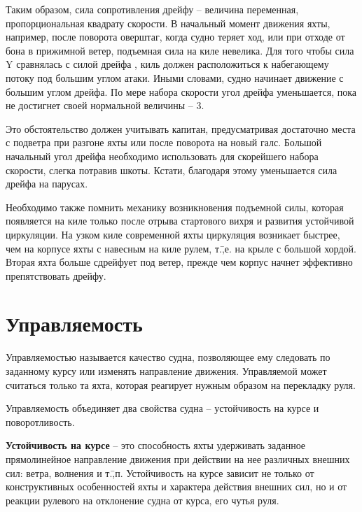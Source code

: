 Таким образом, сила сопротивления дрейфу \--- величина переменная, пропорциональная квадрату скорости. В начальный момент движения яхты, например, после поворота оверштаг, когда судно теряет ход, или при отходе от бона в прижимной ветер, подъемная сила на киле невелика. Для того чтобы сила \ve Y сравнялась с силой дрейфа , киль должен расположиться к набегающему потоку под большим углом атаки. Иными словами, судно начинает движение с большим углом дрейфа. По мере набора скорости угол дрейфа уменьшается, пока не достигнет своей нормальной величины \--- 3\gr.

Это обстоятельство должен учитывать капитан, предусматривая достаточно места с подветра при разгоне яхты или после поворота на новый галс. Большой начальный угол дрейфа необходимо использовать для скорейшего набора скорости, слегка потравив шкоты. Кстати, благодаря этому уменьшается сила дрейфа на парусах. 

Необходимо также помнить механику возникновения подъемной силы, которая появляется на киле только после отрыва стартового вихря и развития устойчивой циркуляции. На узком киле современной яхты циркуляция возникает быстрее, чем на корпусе яхты с навесным на киле рулем, т.\=,е. на крыле с большой хордой. Вторая яхта больше сдрейфует под ветер, прежде чем корпус начнет эффективно препятствовать дрейфу.

\section{Управляемость}

Управляемостью называется качество судна, позволяющее ему следовать по заданному курсу или изменять направление движения. Управляемой может считаться только та яхта, которая реагирует нужным образом на перекладку руля.

Управляемость объединяет два свойства судна \--- устойчивость на курсе и поворотливость.

\textbf{Устойчивость на курсе} \--- это способность яхты удерживать заданное прямолинейное направление движения при действии на нее различных внешних сил: ветра, волнения и т.\=,п. Устойчивость на курсе зависит не только от конструктивных особенностей яхты и характера действия внешних сил, но и от реакции рулевого на отклонение судна от курса, его чутья руля.

